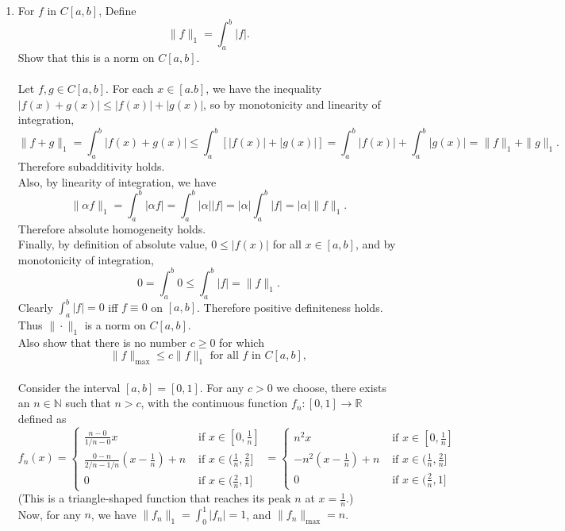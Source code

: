 \begin{enumerate}
	\setcounter{enumi}{0}
	\item For $f$ in $C[a,b]$, Define
	\[
	\| f \|_1 = \int_a^b |f|.	
	\]
	Show that this is a norm on $C[a,b]$.\\\\
	Let $f,g\in C[a,b]$. For each $x\in [a.b]$, we have the inequality $|f(x)+g(x)|\le|f(x)|+|g(x)|$, so by monotonicity and linearity of integration,
	\[
	\|f+g\|_1=\int_a^b|f(x)+g(x)| \le \int_a^b[|f(x)|+|g(x)|] = \int_a^b|f(x)| +\int_a^b|g(x)| = \|f\|_1+\|g\|_1.	
	\]
	Therefore subadditivity holds.\\
	Also, by linearity of integration, we have
	\[
	\|\alpha f\|_1 = \int_a^b|\alpha f| = \int_a^b|\alpha| |f|=|\alpha|\int_a^b| f| = |\alpha|\|f\|_1.	
	\]
	Therefore absolute homogeneity holds.\\
	Finally, by definition of absolute value, $0 \le |f(x)|$ for all $x\in [a,b]$, and by monotonicity of integration,
	\[
	0=\int_a^b 0 \le \int_a^b |f| = \|f\|_1.	
	\] 
	Clearly $\int_a^b |f| = 0$ iff $f\equiv 0$ on $[a,b]$.
	Therefore positive definiteness holds.\\
	Thus $\|\cdot\|_1$ is a norm on $C[a,b]$.\\
	Also show that there is no number $c \ge 0$ for which
	\[
	\| f \|_{\max}	\le c \| f \|_1 \text{ for all $f$ in $C[a,b]$},
	\]
	\\
	Consider the interval $[a,b]=[0,1]$.
	For any $c>0$ we choose, there exists an $n\in \mathbb{N}$ such that $n> c$, with the continuous function $f_n:[0,1]\to \mathbb{R}$ defined as
	\[ 
		f_n(x) =
		\begin{cases} 
			\frac{n-0}{1/n-0}x& \text{ if } x \in [0,\frac{1}{n}]\\
			\frac{0-n}{2/n-1/n}(x-\frac{1}{n})+n & \text{ if } x \in (\frac{1}{n},\frac{2}{n}]\\
			0& \text{ if } x \in (\frac{2}{n},1]
		\end{cases}
		=
		\begin{cases} 
			n^2x& \text{ if } x \in [0,\frac{1}{n}]\\
			-n^2(x-\frac{1}{n})+n & \text{ if } x \in (\frac{1}{n},\frac{2}{n}]\\
			0& \text{ if } x \in (\frac{2}{n},1]
		\end{cases}
	\]
	(This is a triangle-shaped function that reaches its peak $n$ at $x=\frac{1}{n}$.)\\
	Now, for any $n$, we have $\|f_n\|_1 = \int_0^1|f_n|=1$, and $\|f_n\|_{\max} = n$.\\

\end{enumerate}
